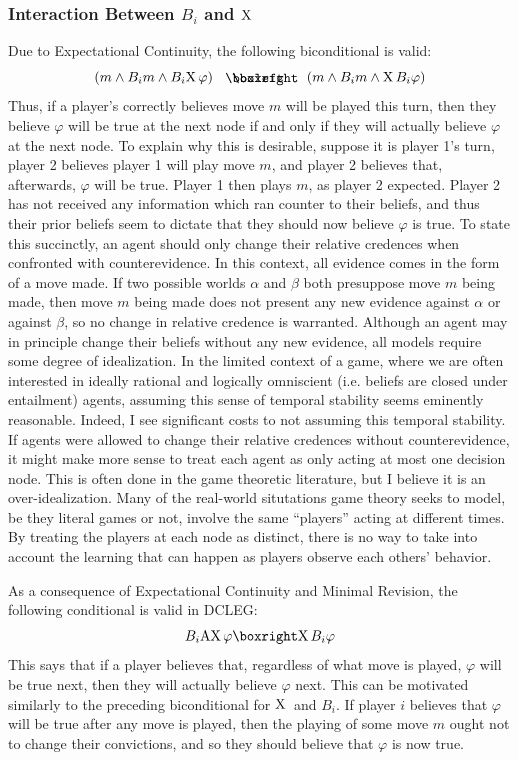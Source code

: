 \documentclass{article}
\begin{document}
\subsubsection{Interaction Between $B_i$ and $\text{X}\,$}
Due to Expectational Continuity, the following biconditional is valid:
\begin{equation*}
    (m\land B_im\land B_i\X\varphi)\boxiff(m \land B_im\land \X B_i\varphi)
\end{equation*}
Thus, if a player's correctly believes move $m$ will be played this turn, then they believe $\varphi$ will be true at the next node if and only if they will actually believe $\varphi$ at the next node. To explain why this is desirable, suppose it is player 1's turn, player 2 believes player 1 will play move $m$, and player 2 believes that, afterwards, $\varphi$ will be true. Player 1 then plays $m$, as player 2 expected. Player 2 has not received any information which ran counter to their beliefs, and thus their prior beliefs seem to dictate that they should now believe $\varphi$ is true. To state this succinctly, an agent should only change their relative credences when confronted with counterevidence. In this context, all evidence comes in the form of a move made. If two possible worlds $\alpha$ and $\beta$ both presuppose move $m$ being made, then move $m$ being made does not present any new evidence against $\alpha$ or against $\beta$, so no change in relative credence is warranted. Although an agent may in principle change their beliefs without any new evidence, all models require some degree of idealization. In the limited context of a game, where we are often interested in ideally rational and logically omniscient (i.e. beliefs are closed under entailment) agents, assuming this sense of temporal stability seems eminently reasonable. Indeed, I see significant costs to not assuming this temporal stability. If agents were allowed to change their relative credences without counterevidence, it might make more sense to treat each agent as only acting at most one decision node. This is often done in the game theoretic literature, but I believe it is an over-idealization. Many of the real-world situtations game theory seeks to model, be they literal games or not, involve the same ``players'' acting at different times. By treating the players at each node as distinct, there is no way to take into account the learning that can happen as players observe each others' behavior.

As a consequence of Expectational Continuity and Minimal Revision, the following conditional is valid in DCLEG:
\begin{equation*}
    B_i\AX\varphi\boxright\X B_i\varphi
\end{equation*}
This says that if a player believes that, regardless of what move is played, $\varphi$ will be true next, then they will actually believe $\varphi$ next. This can be motivated similarly to the preceding biconditional for $\text{X}\,$ and $B_i$. If player $i$ believes that $\varphi$ will be true after any move is played, then the playing of some move $m$ ought not to change their convictions, and so they should believe that $\varphi$ is now true.
\end{document}
